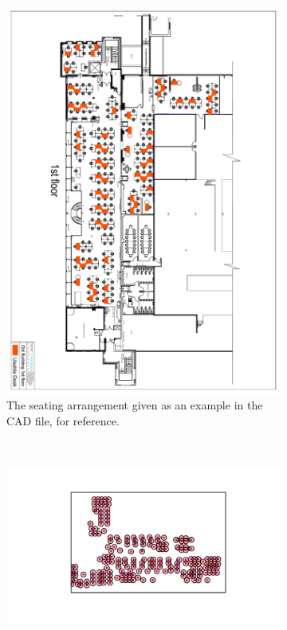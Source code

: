 \documentclass[11pt,a4paper]{article}
\begin{document}
\begin{figure}[ht!]
\centering
\begin{subfigure}[h]{0.95\linewidth}
\centering
\includegraphics[scale = 0.36, angle = 90]{Old_building_1st_floor_usable_desks.pdf}
\caption{The seating arrangement given as an example in the CAD file, for reference.}
\label{Reference}
\end{subfigure}
~
\begin{subfigure}[h]{0.49\linewidth}
\centering
\includegraphics[width = \linewidth]{best_1m_next.png}

\end{subfigure}
\end{figure}
\end{document}
